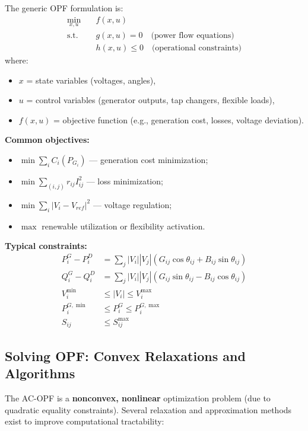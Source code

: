 \documentclass[11pt]{article}
\begin{document}
	The generic OPF formulation is:
	\[
	\begin{aligned}
		\min_{x,u} \quad & f(x,u) \\
		\text{s.t.} \quad & g(x,u) = 0 \quad \text{(power flow equations)}\\
		& h(x,u) \le 0 \quad \text{(operational constraints)}
	\end{aligned}
	\]
	where:
	\begin{itemize}
		\item $x$ = state variables (voltages, angles),
		\item $u$ = control variables (generator outputs, tap changers, flexible loads),
		\item $f(x,u)$ = objective function (e.g., generation cost, losses, voltage deviation).
	\end{itemize}
	
	\textbf{Common objectives:}
	\begin{itemize}
		\item $\min \sum_i C_i(P_{G_i})$ — generation cost minimization;
		\item $\min \sum_{(i,j)} r_{ij} I_{ij}^2$ — loss minimization;
		\item $\min \sum_i |V_i - V_{ref}|^2$ — voltage regulation;
		\item $\max$ renewable utilization or flexibility activation.
	\end{itemize}
	
	\textbf{Typical constraints:}
	\begin{align*}
		P_i^{G} - P_i^{D} &= \sum_{j} |V_i||V_j|(G_{ij}\cos\theta_{ij} + B_{ij}\sin\theta_{ij}) \\
		Q_i^{G} - Q_i^{D} &= \sum_{j} |V_i||V_j|(G_{ij}\sin\theta_{ij} - B_{ij}\cos\theta_{ij}) \\
		V_i^{\min} &\le |V_i| \le V_i^{\max} \\
		P_i^{G,\min} &\le P_i^{G} \le P_i^{G,\max} \\
		S_{ij} &\le S_{ij}^{\max}
	\end{align*}
	
	\subsection{Solving OPF: Convex Relaxations and Algorithms}
	
	The AC-OPF is a \textbf{nonconvex, nonlinear} optimization problem (due to quadratic equality constraints).  
	Several relaxation and approximation methods exist to improve computational tractability:
	
\end{document}
